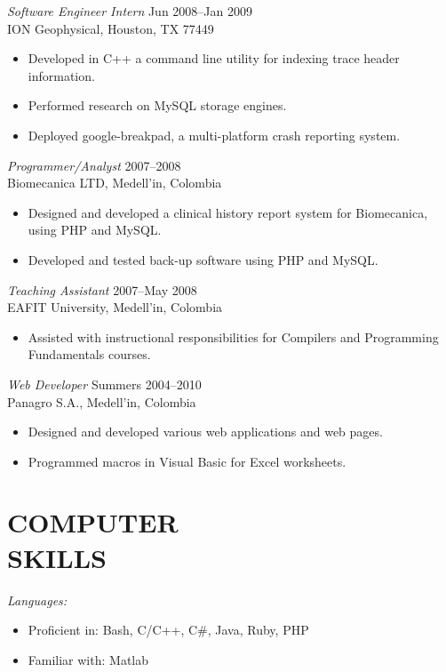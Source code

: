\documentclass[line,margin]{res}
\begin{document}
\begin{resume}
{\sl Software Engineer Intern} \hfill Jun 2008--Jan 2009\\
ION Geophysical, Houston, TX 77449
\begin{itemize} \itemsep -2pt
    \item Developed in C++ a command line utility for indexing trace header information.
    \item Performed research on MySQL storage engines.
    \item Deployed google-breakpad, a multi-platform crash reporting system.
\end{itemize}

{\sl Programmer/Analyst} \hfill 2007--2008\\
Biomecanica LTD, Medell\a'in, Colombia
\begin{itemize} \itemsep -2pt
    \item Designed and developed a clinical history report system for Biomecanica, using PHP and MySQL.
    \item Developed and tested back-up software using PHP and MySQL.
\end{itemize}

{\sl Teaching Assistant} \hfill 2007--May 2008\\
EAFIT University, Medell\a'in, Colombia
\begin{itemize} \itemsep -2pt
    \item  Assisted with instructional responsibilities for Compilers and Programming Fundamentals courses.
\end{itemize}

{\sl Web Developer} \hfill Summers  2004--2010\\
Panagro S.A., Medell\a'in, Colombia
\begin{itemize} \itemsep -2pt
    \item Designed and developed various web applications and web pages.  
    \item Programmed macros in Visual Basic for Excel worksheets.
\end{itemize}

 
\section{COMPUTER \\ SKILLS} %
\label{sec:computer_skills}
    {\sl Languages:}
    \begin{itemize} \itemsep -2pt
        \item Proficient in: Bash, C/C++, C\#, Java, Ruby, PHP
        \item Familiar with: Matlab
    \end{itemize}


\end{resume}
\end{document}
